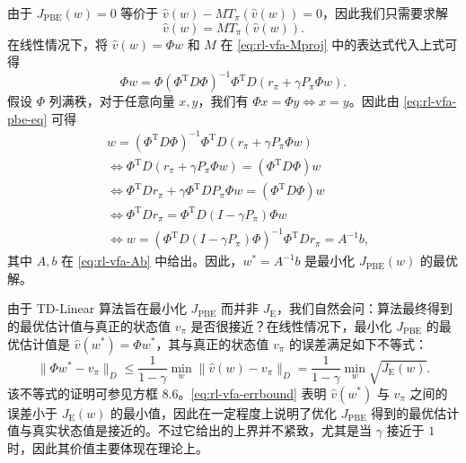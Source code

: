 \begin{note}[方框 8.5：证明 $J_{\mathrm{PBE}}(w)$ 的最优解是 $w^{*} = A^{-1}b$]
由于 $J_{\mathrm{PBE}}(w) = 0$ 等价于 $\hat{v}(w) - MT_{\pi}(\hat{v}(w)) = 0$，因此我们只需要求解
\begin{equation*}
\hat{v}(w) = M T_{\pi}(\hat{v}(w)).
\end{equation*}
在线性情况下，将 $\hat{v}(w) = \Phi w$ 和 $M$ 在 \cref{eq:rl-vfa-Mproj} 中的表达式代入上式可得
\begin{equation}
\Phi w = \Phi (\Phi^{\mathrm{T}} D \Phi)^{-1} \Phi^{\mathrm{T}} D (r_{\pi} + \gamma P_{\pi} \Phi w).
\label{eq:rl-vfa-pbe-eq}
\end{equation}
假设 $\Phi$ 列满秩，对于任意向量 $x, y$，我们有 $\Phi x = \Phi y \Leftrightarrow x = y$。因此由 \cref{eq:rl-vfa-pbe-eq} 可得
\begin{equation*}
\begin{aligned}
& w = (\Phi^{\mathrm{T}} D \Phi)^{-1} \Phi^{\mathrm{T}} D (r_{\pi} + \gamma P_{\pi} \Phi w) \\
& \Longleftrightarrow \Phi^{\mathrm{T}} D (r_{\pi} + \gamma P_{\pi} \Phi w) = (\Phi^{\mathrm{T}} D \Phi) w \\
& \Longleftrightarrow \Phi^{\mathrm{T}} D r_{\pi} + \gamma \Phi^{\mathrm{T}} D P_{\pi} \Phi w = (\Phi^{\mathrm{T}} D \Phi) w \\
& \Longleftrightarrow \Phi^{\mathrm{T}} D r_{\pi} = \Phi^{\mathrm{T}} D (I - \gamma P_{\pi}) \Phi w \\
& \Longleftrightarrow w = (\Phi^{\mathrm{T}} D (I - \gamma P_{\pi}) \Phi)^{-1} \Phi^{\mathrm{T}} D r_{\pi} = A^{-1} b,
\end{aligned}
\end{equation*}
其中 $A, b$ 在 \cref{eq:rl-vfa-Ab} 中给出。因此，$w^{*} = A^{-1}b$ 是最小化 $J_{\mathrm{PBE}}(w)$ 的最优解。
\end{note}

由于 TD-Linear 算法旨在最小化 $J_{\mathrm{PBE}}$ 而并非 $J_{\mathrm{E}}$，我们自然会问：算法最终得到的最优估计值与真正的状态值 $v_{\pi}$ 是否很接近？在线性情况下，最小化 $J_{\mathrm{PBE}}$ 的最优估计值是 $\hat{v}(w^{*}) = \Phi w^{*}$，其与真正的状态值 $v_{\pi}$ 的误差满足如下不等式：
\begin{equation}
\| \Phi w^{*} - v_{\pi} \|_{D} \leqslant \frac{1}{1 - \gamma} \min_{w} \| \hat{v}(w) - v_{\pi} \|_{D} = \frac{1}{1 - \gamma} \min_{w} \sqrt{J_{\mathrm{E}}(w)}.
\label{eq:rl-vfa-errbound}
\end{equation}
该不等式的证明可参见方框 8.6。\cref{eq:rl-vfa-errbound} 表明 $\hat{v}(w^{*})$ 与 $v_{\pi}$ 之间的误差小于 $J_{\mathrm{E}}(w)$ 的最小值，因此在一定程度上说明了优化 $J_{\mathrm{PBE}}$ 得到的最优估计值与真实状态值是接近的。不过它给出的上界并不紧致，尤其是当 $\gamma$ 接近于 $1$ 时，因此其价值主要体现在理论上。

